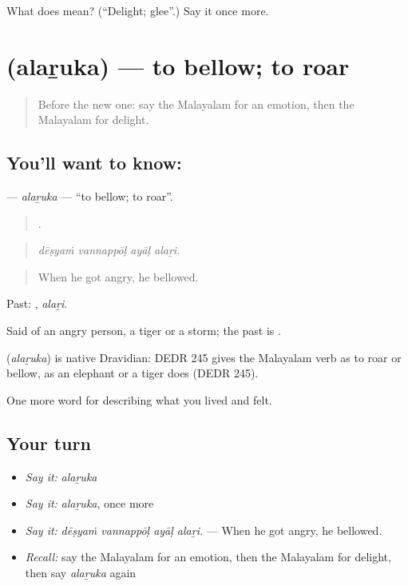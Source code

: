 \begin{tcolorbox}[breakable,colback=teal!4,colframe=teal!35!black,title={Before you move on}]
What does  mean? (\textquotedblleft{}Delight; glee\textquotedblright{}.) Say it once more.
\end{tcolorbox}
\section[\texorpdfstring{\ml{അലറുക} (alaṟuka)}{അലറുക (alaṟuka)}]{ (alaṟuka) — to bellow; to roar}

\label{lesson:ML-C517-alaruka}



\begin{quote}
Before the new one: say the Malayalam for an emotion, then the Malayalam for delight.
\end{quote}

\subsection*{You'll want to know: }
\textbf{} — \emph{alaṟuka} — \textquotedblleft{}to bellow; to roar\textquotedblright{}.

\begin{quote}
   .
\end{quote}

\begin{quote}
\emph{dēṣyaṁ vannappōḷ ayāḷ alaṟi.}
\end{quote}

\begin{quote}
When he got angry, he bellowed.
\end{quote}

Past: , \emph{alaṟi}.

Said of an angry person, a tiger or a storm; the past is .

\begin{cousinweb}
\textbf{} (\emph{alaṟuka}) is native Dravidian: DEDR 245 gives the Malayalam verb as to roar or bellow, as an elephant or a tiger does (DEDR 245).
\end{cousinweb}

\begin{grammarlens}[title={What you've built}]
One more word for describing what you lived and felt.
\end{grammarlens}

\subsection*{Your turn}
\begin{itemize}
\raggedright
  \item \emph{Say it:} \emph{alaṟuka}
  \item \emph{Say it:} \emph{alaṟuka}, once more
  \item \emph{Say it:} \emph{dēṣyaṁ vannappōḷ ayāḷ alaṟi.} — When he got angry, he bellowed.
  \item \emph{Recall:} say the Malayalam for an emotion, then the Malayalam for delight, then say \emph{alaṟuka} again
\end{itemize}

